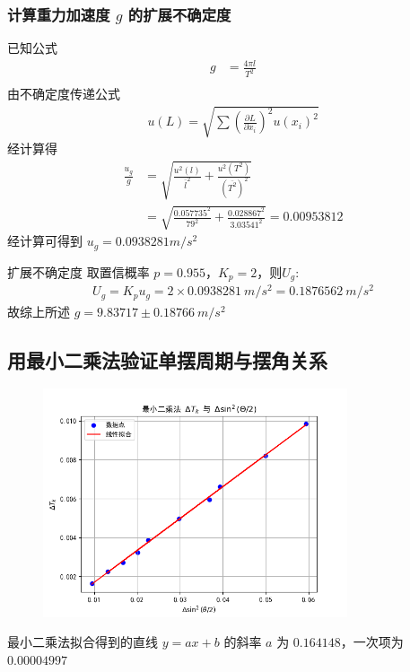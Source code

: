 \documentclass[UTF8]{ctexart}
\begin{document}
\subsubsection{计算重力加速度 $g$ 的扩展不确定度}
已知公式
\begin{align*}
    g &= \frac{4\pi l}{T^2} \\
\end{align*}
由不确定度传递公式
\begin{align*}
    u(L) = \sqrt{\sum (\frac{\partial L}{\partial x_i})^2u(x_i)^2 } 
\end{align*}
经计算得
\begin{align*}
    \frac{u_g}{g} &= \sqrt{
    \frac{u^2(l)}{\overline{l}^2} +
    \frac{u^2(T^2)}{(\overline{T^2})^2}
    }    \\
    &= \sqrt{\frac{0.057735^2}{79^2} +
    \frac{0.028867^2}{3.03541^2}
    } = 0.00953812 
\end{align*}
经计算可得到 $u_g = 0.0938281 m/s^2$

扩展不确定度 取置信概率 $p = 0.955$，$K_p = 2$，则$U_g$:
\begin{align*}
    U_g = K_p u_g  = 2 \times 0.0938281 \ m/s^2 = 0.1876562 \ m/s^2
\end{align*}
故综上所述 $g = 9.83717 \pm 0.18766 \ m/s^2$

\subsection{用最小二乘法验证单摆周期与摆角关系}
 \begin{figure}[H]  %
		\centering
		\includegraphics[width=0.8\textwidth,height=0.6\textwidth]{img/周期差与sin差.png}
		\label{fig:side:b} 
\end{figure}
最小二乘法拟合得到的直线 $y = ax+b$ 的斜率 $a$ 为 $0.164148$，一次项为 $0.00004997$ 
\end{document}
